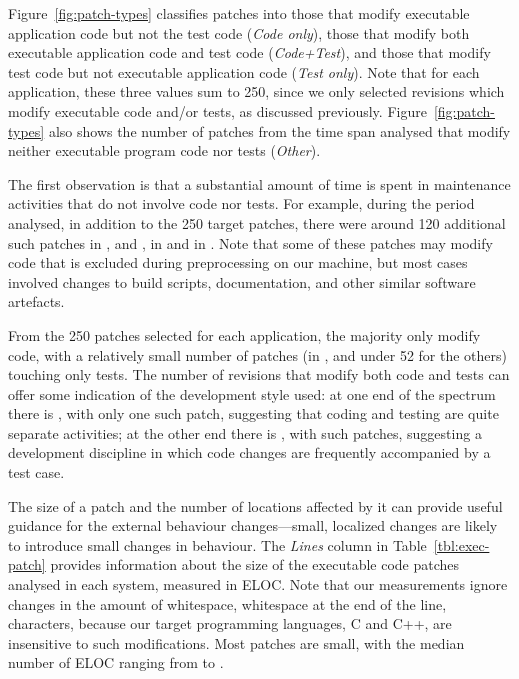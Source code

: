 Figure~\ref{fig:patch-types} classifies patches into those that modify
executable application code but not the test code (\textit{Code
only}), those that modify both executable application code and test
code (\textit{Code+Test}), and those that modify test code but not
executable application code (\textit{Test only}).  Note that for each
application, these three values sum to 250, since we only selected
revisions which modify executable code and/or tests, as discussed
previously.  Figure~\ref{fig:patch-types} also shows the number of
patches from the time span analysed that modify neither executable
program code nor tests (\textit{Other}).

The first observation is that a substantial amount of time is spent in
maintenance activities that do not involve code nor tests.  For example, during
the period analysed, in addition to the 250 target patches, there were around
120 additional such patches in \binutils, \memcached and \zeromq,
\beanstalkdNoTestNoExecutableRevs in \beanstalkd and \gitNoTestNoExecutableRevs
in \git. Note that some of these patches may modify code that is excluded
during preprocessing on our machine, but most cases involved changes to build
scripts, documentation, and other similar software artefacts.

From the 250 patches selected for each application, the majority only
modify code, with a relatively small number of patches
(\gitOnlyTestRevs in \git, and under 52 for the others) touching only
tests. The number of revisions that modify both code and tests can
offer some indication of the development style used: at one end of the
spectrum there is \redis, with only one such patch, suggesting that
coding and testing are quite separate activities; at the other end
there is \git, with \gitTestAndExecutableRevs such patches, suggesting a
development discipline in which code changes are frequently
accompanied by a test case. %




The size of a patch and the number of locations affected by it can provide
useful guidance for the external behaviour changes---small, localized changes
are likely to introduce small changes in behaviour. The \textit{Lines} column
in Table~\ref{tbl:exec-patch} provides information about the size of the
executable code patches analysed in each system, measured in ELOC. Note that
our measurements ignore changes in the amount of whitespace, \eg whitespace at
the end of the line, characters, because our target programming languages, C
and C++, are insensitive to such modifications.  Most patches are small, with
the median number of ELOC ranging from \redisPatchMedian to \gitPatchMedian.

